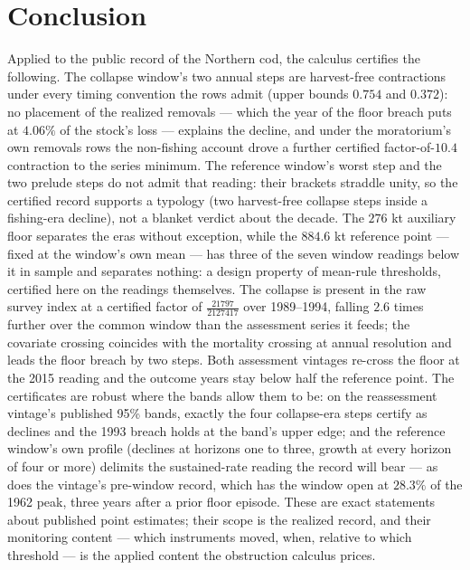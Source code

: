 \section{Conclusion}\label{regime-conclusion}

Applied to the public record of the Northern cod, the calculus
certifies the following. The collapse window's two annual steps are
harvest-free contractions under every timing convention the rows admit
(upper bounds \(0.754\) and \(0.372\)): no placement of the realized
removals --- which the year of the floor breach puts at \(4.06\%\) of
the stock's loss --- explains the decline, and under the moratorium's
own removals rows the non-fishing account drove a further certified
factor-of-\(10.4\) contraction to the series minimum. The reference
window's worst step and the two prelude steps do not admit that
reading: their brackets straddle unity, so the certified record
supports a typology (two harvest-free collapse steps inside a
fishing-era decline), not a blanket verdict about the decade. The
\(276\) kt auxiliary floor separates the eras without exception,
while the \(884.6\) kt reference point --- fixed at the window's own
mean --- has three of the seven window readings below it in sample
and separates nothing: a design property of mean-rule thresholds,
certified here on the readings themselves. The collapse is present in
the raw survey index at a certified factor of
\(\tfrac{21797}{2127417}\) over 1989--1994, falling \(2.6\) times
further over the common window than the assessment series it feeds;
the covariate crossing coincides with the mortality crossing at annual
resolution and leads the floor breach by two steps. Both assessment
vintages re-cross the floor at the 2015 reading and the outcome years
stay below half the reference point. The certificates are robust
where the bands allow them to be: on the reassessment vintage's
published 95\% bands, exactly the four collapse-era steps certify as
declines and the 1993 breach holds at the band's upper edge; and the
reference window's own profile (declines at horizons one to three,
growth at every horizon of four or more) delimits the sustained-rate
reading the record will bear --- as does the vintage's pre-window
record, which has the window open at \(28.3\%\) of the 1962 peak,
three years after a prior floor episode. These are exact statements about
published point estimates; their scope is the realized record, and
their monitoring content --- which instruments moved, when, relative to
which threshold --- is the applied content the obstruction calculus
prices.

